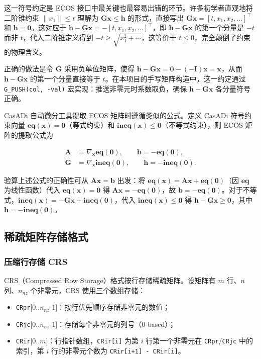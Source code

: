 这一符号约定是 ECOS 接口中最关键也最容易出错的环节。许多初学者直观地将二阶锥约束 $\|x_1\| \leq t$ 理解为 $\bm{G}{\bm{x}} \leq \bm{h}$ 的形式，直接写出 $\bm{G}{\bm{x}} = [t, x_1, x_2, \ldots]^{\top}$ 和 $\bm{h} = \bm{0}$。这对应于 $\bm{h} - \bm{G}{\bm{x}} = -[t, x_1, x_2, \ldots]^{\top}$，即 $\bm{h} - \bm{G}{\bm{x}}$ 的第一个分量是 $-t$ 而非 $t$，代入二阶锥定义得到 $-t \geq \sqrt{x_1^2 + \cdots}$，这等价于 $t \leq 0$，完全颠倒了约束的物理含义。

正确的做法是令 $\bm{G}$ 采用负单位矩阵，使得 $\bm{h} - \bm{G}{\bm{x}} = \bm{0} - (-\bm{I}){\bm{x}} = \bm{x}$，从而 $\bm{h} - \bm{G}{\bm{x}}$ 的第一个分量直接等于 $t$。在本项目的手写矩阵构造中，这一约定通过 \lstinline{G_PUSH(col, -val)} 宏实现：推送非零元时系数取负，确保 $\bm{h} - \bm{G}{\bm{x}}$ 各分量符号正确。

CasADi 自动微分工具提取 ECOS 矩阵时遵循类似的公式。定义 CasADi 符号约束向量 $\bm{eq}(\bm{x}) = \bm{0}$（等式约束）和 $\bm{ineq}(\bm{x}) \leq \bm{0}$（不等式约束），则 ECOS 矩阵的提取公式为

\begin{align}
\bm{A} &= \nabla_{\bm{x}}\bm{eq}(\bm{0}), \qquad
\bm{b} = -\bm{eq}(\bm{0}), \\
\bm{G} &= \nabla_{\bm{x}}\bm{ineq}(\bm{0}), \qquad
\bm{h} = -\bm{ineq}(\bm{0}).
\end{align}

验算上述公式的正确性可从 $\bm{A}\bm{x} = \bm{b}$ 出发：将 $\bm{eq}(\bm{x}) = \bm{A}\bm{x} + \bm{eq}(\bm{0})$（因 $\bm{eq}$ 为线性函数）代入 $\bm{eq}(\bm{x}) = \bm{0}$ 得 $\bm{A}\bm{x} = -\bm{eq}(\bm{0})$，故 $\bm{b} = -\bm{eq}(\bm{0})$。对于不等式，$\bm{ineq}(\bm{x}) = -\bm{G}\bm{x} + \bm{ineq}(\bm{0})$，代入 $\bm{ineq}(\bm{x}) \leq \bm{0}$ 得 $\bm{h} - \bm{G}\bm{x} \geq \bm{0}$，其中 $\bm{h} = -\bm{ineq}(\bm{0})$。

\subsection{稀疏矩阵存储格式}

\subsubsection{压缩行存储 CRS}

CRS（Compressed Row Storage）格式按行存储稀疏矩阵。设矩阵有 $m$ 行、$n$ 列、$n_{nz}$ 个非零元，CRS 使用三个数组存储：

\begin{itemize}
    \item \lstinline{CRpr}[0..$n_{nz}$-1]：按行优先顺序存储非零元的数值；
    \item \lstinline{CRjc}[0..$n_{nz}$-1]：存储每个非零元的列号（0-based）；
    \item \lstinline{CRir}[0..$m$]：行指针数组，\lstinline{CRir[i]} 为第 $i$ 行第一个非零元在 \lstinline{CRpr}/\lstinline{CRjc} 中的索引，第 $i$ 行的非零元个数为 \lstinline{CRir[i+1] - CRir[i]}。
\end{itemize}

